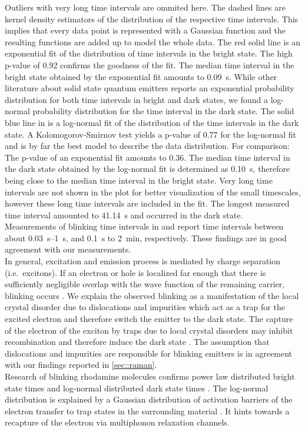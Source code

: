 		Outliers with very long time intervals are ommited here.
		The dashed lines are kernel density estimators of the distribution of the respective time intervals.
		This implies that every data point is represented with a Gaussian function and the resulting functions are added up to model the whole data.
		The red solid line is an exponential fit of the distribution of time intervals in the bright state.
		The high p-value of \num{0.92} confirms the goodness of the fit.
		The median time interval in the bright state obtained by the exponential fit amounts to \SI[separate-uncertainty]{0.09}{s}.
		While other literature about solid state quantum emitters reports an exponential probability distribution for both time intervals in bright and dark states\cite{Bradac2010,Berhane2017}, we found a log-normal probability distribution for the time interval in the dark state.
		The solid blue line in  is a log-normal fit of the distribution of the time intervals in the dark state.
		A Kolomogorov-Smirnov test yields a p-value of \num{0.77} for the log-normal fit and is by far the best model to describe the data distribution.
		For comparison: The p-value of an exponential fit amounts to \num{0.36}.
		The median time interval in the dark state obtained by the log-normal fit is determined as \SI{0.10}{s}, therefore being close to the median time interval in the bright state.
		Very long time intervals are not shown in the plot for better visualization of the small timescales, however these long time intervals are included in the fit.
		The longest measured time interval amounted to \SI{41.14}{s} and occurred in the dark state.
		\\
		Measurements of blinking time intervals in \cite{Jantzen2016} and \cite{Neu2012a} report time intervals between about \SIrange{0.03}{1}{s}, and \SI{0.1}{s} to \SI{2}{min}, respectively.
		These findings are in good agreement with our measurements.
		\\
		In general, excitation and emission process is mediated by charge separation (i.e.\ excitons).
		If an electron or hole is localized far enough that there is sufficiently negligible overlap with the wave function of the remaining carrier, blinking occurs \cite{Efros2016}.
		We explain the observed blinking as a manifestation of the local crystal disorder due to dislocations and impurities which act as a trap for the excited electron and therefore switch the emitter to the dark state.
		The capture of the electron of the exciton by traps due to local crystal disorders may inhibit recombination and therefore induce the dark state \cite{Bradac2010}.
		The assumption that dislocations and impurities are responsible for blinking emitters is in agreement with our findings reported in \ref{sec::raman}.
		\\
		Research of blinking rhodamine molecules confirms power law distributed bright state times and log-normal distributed dark state times \cite{Wong2013}.
		The log-normal distribution is explained by a Gaussian distribution of activation barriers of the electron transfer to trap states in the surrounding material \cite{Albery1985}.
		It hints towards a recapture of the electron via multiphonon relaxation channels.
